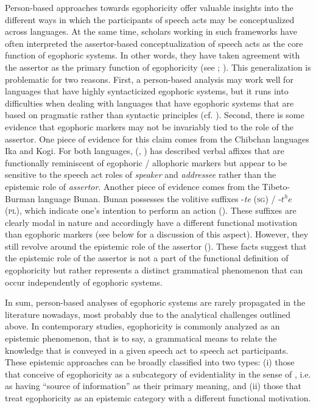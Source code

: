 \documentclass[output=paper]{langsci/langscibook}
\begin{document}
Person-based approaches towards egophoricity offer valuable insights into the different ways in which the participants of speech acts may be conceptualized across languages. At the same time, scholars working in such frameworks have often interpreted the assertor-based conceptualization of speech acts as the core function of egophoric systems. In other words, they have taken agreement with the assertor as the primary function of egophoricity (see \citealt{BickelNichols2007}; \citealt{Creissels2008}). This generalization is problematic for two reasons. First, a person-based analysis may work well for languages that have highly syntacticized egophoric systems, but it runs into difficulties when dealing with languages that have egophoric systems that are based on pragmatic rather than syntactic principles (cf. \citealt{SanRoque2018}). Second, there is some evidence that egophoric markers may not be invariably tied to the role of the assertor. One piece of evidence for this claim comes from the Chibchan languages Ika and Kogi. For both languages, \citeauthor{Bergqvist2012} (\citeyear{Bergqvist2012}, \citeyear{Bergqvist2016}) has described verbal affixes that are functionally reminiscent of egophoric / allophoric markers but appear to be sensitive to the speech act roles of \emph{speaker} and \emph{addressee} rather than the epistemic role of \emph{assertor}. Another piece of evidence comes from the Tibeto-Burman language Bunan. Bunan possesses the volitive suffixes -\textit{te} (\textsc{sg}) / -\textit{$t^he$} (\textsc{pl}), which indicate one’s intention to perform an action (\citealt[555--556]{Widmer2017a}). These suffixes are clearly modal in nature and accordingly have a different functional motivation than egophoric markers (see below for a discussion of this aspect). However, they still revolve around the epistemic role of the assertor (\citealt[453--459]{Widmer2017a}). These facts suggest that the epistemic role of the assertor is not a part of the functional definition of egophoricity but rather represents a distinct grammatical phenomenon that can occur independently of egophoric systems.

In sum, person-based analyses of egophoric systems are rarely propagated in the literature nowadays, most probably due to the analytical challenges outlined above. In contemporary studies, egophoricity is commonly analyzed as an epistemic phenomenon, that is to say, a grammatical means to relate the knowledge that is conveyed in a given speech act to speech act participants. These epistemic approaches can be broadly classified into two types: (i) those that conceive of egophoricity as a subcategory of evidentiality in the sense of \cite{Aikhenvald2004}, i.e. as having “source of information” as their primary meaning, and (ii) those that treat egophoricity as an epistemic category with a different functional motivation.
\end{document}
